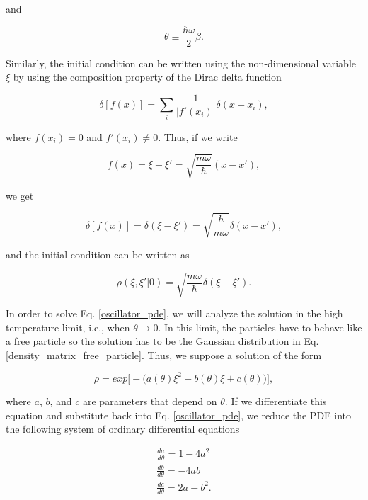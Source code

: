 \documentclass{article}
\begin{document}
and

\begin{equation}
    \theta \equiv \frac{\hbar \omega}{2} \beta.
\end{equation}

Similarly, the initial condition can be written using the non-dimensional variable $\xi$ by using the composition property of the Dirac delta function

\begin{equation}
    \delta[f(x)] = \sum_{i}\frac{1}{|f'(x_{i})|} \delta(x-x_{i}),
\end{equation}

where $f(x_{i})=0$ and $f'(x_i)\neq0$. Thus, if we write

\begin{equation}
    f(x)=\xi-\xi'=\sqrt{\frac{m\omega}{\hbar}}(x-x'),
\end{equation}

we get

\begin{equation}
    \delta[f(x)] = \delta(\xi-\xi')=\sqrt{\frac{\hbar}{m\omega}}\delta(x-x'),
\end{equation}

and the initial condition can be written as

\begin{equation}\label{oscillator_pde_initial_condition}
    \rho(\xi,\xi'|0) = \sqrt{\frac{m\omega}{\hbar}} \delta(\xi-\xi').
\end{equation}

In order to solve Eq. \ref{oscillator_pde}, we will analyze the solution in the high temperature limit, i.e., when $\theta \longrightarrow 0$. In this limit, the particles have to behave like a free particle so the solution has to be the Gaussian distribution in Eq. \ref{density_matrix_free_particle}. Thus, we suppose a solution of the form

\begin{equation}\label{oscillator_pre_solution}
    \rho = exp\big[-\big(a(\theta)\xi^{2} + b(\theta)\xi + c(\theta)\big)\big],
\end{equation}

where $a$, $b$, and $c$ are parameters that depend on $\theta$. If we differentiate this equation and substitute back into Eq. \ref{oscillator_pde}, we reduce the PDE into the following system of ordinary differential equations

\begin{equation}\label{oscillator_system_ode}
    \begin{split}
        \frac{d a}{d\theta} = 1 - 4a^{2} \\ \frac{d b}{d\theta}=-4ab \\ \frac{dc}{d\theta}=2a-b^{2}.
    \end{split}
\end{equation}
\end{document}
